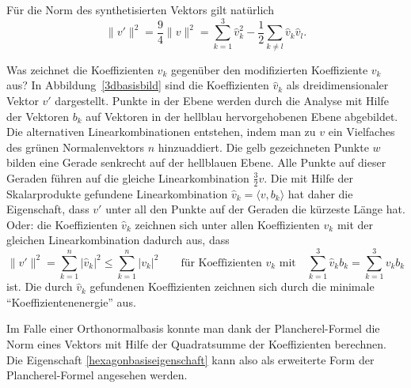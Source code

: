 Für die Norm des synthetisierten Vektors gilt natürlich
\[
\|v'\|^2
=
\frac94\|v\|^2
=
\sum_{k=1}^3 \hat{v}_k^2 
-
\frac12\sum_{k\ne l} \hat{v}_k\hat{v}_l.
\]

Was zeichnet die Koeffizienten $\hat{v}_k$ gegenüber den modifizierten
Koeffiziente $v_k$ aus?
In Abbildung~\ref{3dbasisbild} sind die Koeffizienten $\hat{v}_k$ als
dreidimensionaler Vektor $v'$ dargestellt.
Punkte in der Ebene werden durch die Analyse mit Hilfe der Vektoren $b_k$
auf Vektoren in der hellblau hervorgehobenen Ebene abgebildet.
Die alternativen Linearkombinationen entstehen, indem man zu $v$
ein Vielfaches des grünen Normalenvektors $n$ hinzuaddiert.
Die gelb gezeichneten Punkte $w$ bilden eine Gerade senkrecht
auf der hellblauen Ebene.
Alle Punkte auf dieser Geraden führen auf die gleiche
Linearkombination $\frac32v$.
Die mit Hilfe der Skalarprodukte gefundene Linearkombination
$\hat{v}_k=\langle v,b_k\rangle$ hat daher die Eigenschaft, 
dass $v'$ unter all den Punkte auf der Geraden die kürzeste Länge hat.
Oder: die Koeffizienten $\hat{v}_k$ zeichnen sich unter allen
Koeffizienten $v_k$ mit der gleichen Linearkombination dadurch aus, 
dass
\begin{equation}
\|v'\|^2
=
\sum_{k=1}^n |\hat{v}_k|^2
\le
\sum_{k=1}^n |v_k|^2
\qquad
\text{für Koeffizienten $v_k$ mit}
\quad
\sum_{k=1}^3 \hat{v}_kb_k
=
\sum_{k=1}^3 v_kb_k
\label{hexagonbasiseigenschaft}
\end{equation}
ist.
Die durch $\hat{v}_k$ gefundenen Koeffizienten zeichnen sich durch
die minimale ``Koeffizientenenergie'' aus.

Im Falle einer Orthonormalbasis konnte man dank der Plancherel-Formel
die Norm eines Vektors mit Hilfe der Quadratsumme der Koeffizienten
berechnen.
Die Eigenschaft \eqref{hexagonbasiseigenschaft} kann also als erweiterte
Form der Plancherel-Formel angesehen werden.

